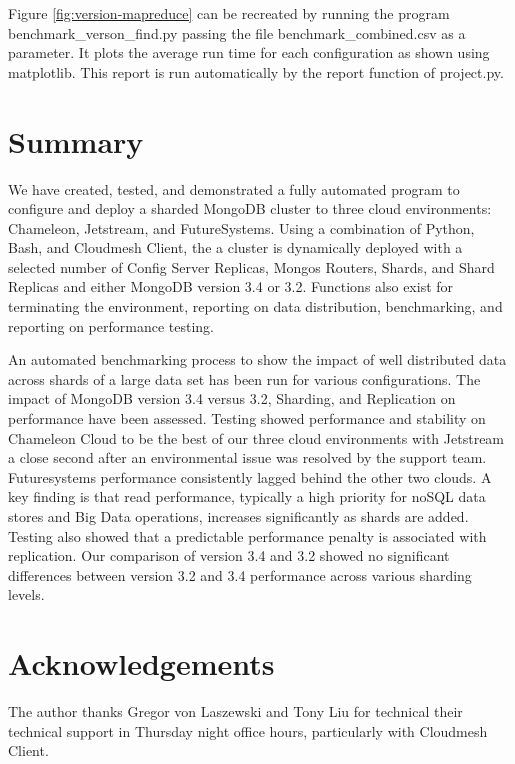 \documentclass[9pt,twocolumn,twoside]{../../styles/osajnl}
\begin{document}
Figure \ref{fig:version-mapreduce} can be recreated by running the program benchmark\_verson\_find.py passing the file benchmark\_combined.csv as a parameter.  It plots the average run time for each configuration as shown using matplotlib.  This report is run automatically by the report function of project.py.



\section{Summary}

We have created, tested, and demonstrated a fully automated program to configure and deploy a sharded MongoDB cluster to three cloud environments: Chameleon, Jetstream, and FutureSystems.  Using a combination of Python, Bash, and Cloudmesh Client, the a cluster is dynamically deployed with a selected number of Config Server Replicas, Mongos Routers, Shards, and Shard Replicas and either MongoDB version 3.4 or 3.2. Functions also exist for terminating the environment, reporting on data distribution, benchmarking, and reporting on performance testing.

An automated benchmarking process to show the impact of well distributed data across shards of a large data set has been run for various configurations. The impact of MongoDB version 3.4 versus 3.2, Sharding, and Replication on performance have been assessed.  Testing showed performance and stability on Chameleon Cloud to be the best of our three cloud environments with Jetstream a close second after an environmental issue was resolved by the support team.  Futuresystems performance consistently lagged behind the other two clouds.  A key finding is that read performance, typically a high priority for noSQL data stores and Big Data operations, increases significantly as shards are added.  Testing also showed that a predictable performance penalty is associated with replication.  Our comparison of version 3.4 and 3.2 showed no significant differences between version 3.2 and 3.4 performance across various sharding levels.

\section*{Acknowledgements}

The author thanks Gregor von Laszewski and Tony Liu for technical their technical support in Thursday night office hours, particularly with Cloudmesh Client.
\end{document}
